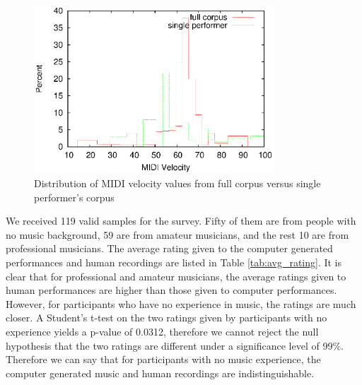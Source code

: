 \begin{figure}[tp]
   \begin{center}
      \includegraphics[width=0.8\textwidth]{fig/all_01_velocity}
   \end{center}
   \caption{Distribution of MIDI velocity values from full corpus versus single performer's corpus}
   \label{fig:distvel}
\end{figure}




We received 119 valid samples for the survey. Fifty of them are from people with no music background, 59 are from amateur musicians, and the rest 10 are from professional musicians. The average rating given to the computer generated performances and human recordings are listed in Table \ref{tab:avg_rating}. It is clear that for professional and amateur musicians, the average ratings given to human performances are higher than those given to computer performances. However, for participants who have no experience in music, the ratings are much closer. A Student's t-test on the two ratings given by participants with no experience yields a p-value of 0.0312, therefore we cannot reject the null hypothesis that the two ratings are different under a significance level of 99\%. Therefore we can say that for participants with no music experience, the computer generated music and human recordings are indistinguishable.


